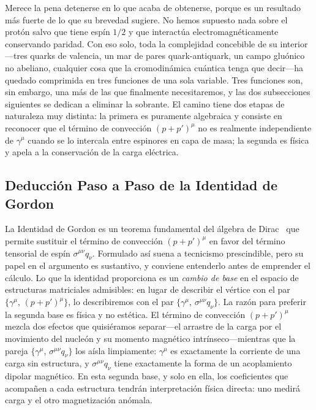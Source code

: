 \documentclass[10pt,a4paper]{article}
\begin{document}
Merece la pena detenerse en lo que acaba de obtenerse, porque es un resultado más fuerte de lo que su brevedad sugiere. No hemos supuesto nada sobre el protón salvo que tiene espín $1/2$ y que interactúa electromagnéticamente conservando paridad. Con eso solo, toda la complejidad concebible de su interior---tres quarks de valencia, un mar de pares quark-antiquark, un campo gluónico no abeliano, cualquier cosa que la cromodinámica cuántica tenga que decir---ha quedado comprimida en tres funciones de una sola variable. Tres funciones son, sin embargo, una más de las que finalmente necesitaremos, y las dos subsecciones siguientes se dedican a eliminar la sobrante. El camino tiene dos etapas de naturaleza muy distinta: la primera es puramente algebraica y consiste en reconocer que el término de convección $(p+p')^\mu$ no es realmente independiente de $\gamma^\mu$ cuando se lo intercala entre espinores en capa de masa; la segunda es física y apela a la conservación de la carga eléctrica.

\subsection{Deducción Paso a Paso de la Identidad de Gordon}
La Identidad de Gordon es un teorema fundamental del álgebra de Dirac~\cite{gordon1928,halzen1984} que permite sustituir el término de convección $(p+p')^\mu$ en favor del término tensorial de espín $\sigma^{\mu\nu} q_\nu$. Formulado así suena a tecnicismo prescindible, pero su papel en el argumento es sustantivo, y conviene entenderlo antes de emprender el cálculo. Lo que la identidad proporciona es un \emph{cambio de base} en el espacio de estructuras matriciales admisibles: en lugar de describir el vértice con el par $\{\gamma^\mu,\,(p+p')^\mu\}$, lo describiremos con el par $\{\gamma^\mu,\,\sigma^{\mu\nu}q_\nu\}$. La razón para preferir la segunda base es física y no estética. El término de convección $(p+p')^\mu$ mezcla dos efectos que quisiéramos separar---el arrastre de la carga por el movimiento del nucleón y su momento magnético intrínseco---mientras que la pareja $\{\gamma^\mu,\,\sigma^{\mu\nu}q_\nu\}$ los aísla limpiamente: $\gamma^\mu$ es exactamente la corriente de una carga sin estructura, y $\sigma^{\mu\nu}q_\nu$ tiene exactamente la forma de un acoplamiento dipolar magnético. En esta segunda base, y solo en ella, los coeficientes que acompañen a cada estructura tendrán interpretación física directa: uno medirá carga y el otro magnetización anómala.
\end{document}
